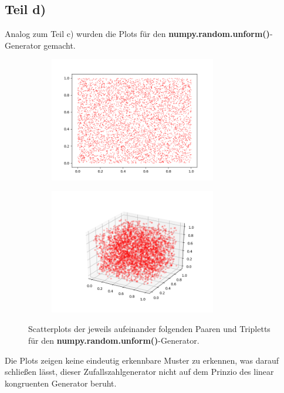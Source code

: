 \subsection{Teil d)}
Analog zum Teil c) wurden die Plots für den \textbf{numpy.random.unform()}-Generator
gemacht.
\begin{figure}[H]
  \begin{subfigure}{0.5\textwidth}
   \centering
   \includegraphics[width=0.8\textwidth]{plots/Paare2d.png}
   \label{fig:Paare2d}
\end{subfigure}
\begin{subfigure}{0.5\textwidth}
  \centering
  \includegraphics[width=0.8\textwidth]{plots/Triplets2d.png}
  \label{fig:Tripletts2d}
\end{subfigure}
\caption{Scatterplots der jeweils aufeinander folgenden Paaren und Tripletts für
den \textbf{numpy.random.unform()}-Generator.}
\end{figure}
Die Plots zeigen keine eindeutig erkennbare Muster zu erkennen, was darauf schließen lässt,
dieser Zufallszahlgenerator nicht auf dem Prinzio des linear kongruenten Generator beruht.
